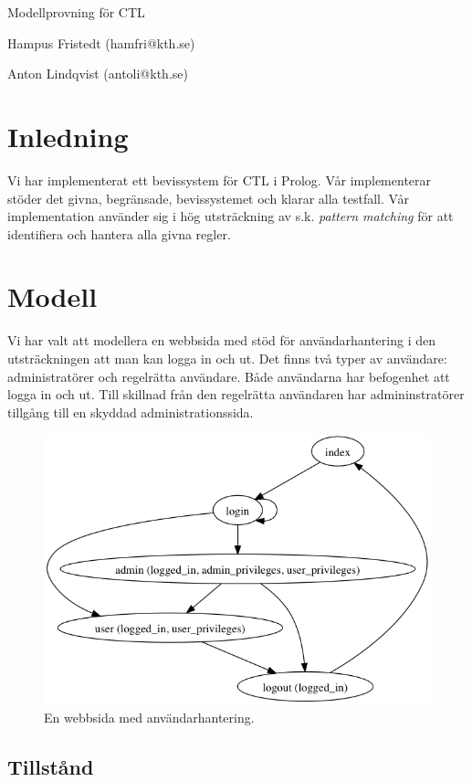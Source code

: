 \documentclass{article}
\begin{document}
  \centerline{\sc \large Modellprovning för CTL}
  \vspace{.5pc}
  \centerline{Hampus Fristedt (hamfri@kth.se)}
  \centerline{Anton Lindqvist (antoli@kth.se)}
  \vspace{2pc}

  \section{Inledning}
  Vi har implementerat ett bevissystem för CTL i Prolog. Vår implementerar
  stöder det givna, begränsade, bevissystemet och klarar alla testfall. Vår
  implementation använder sig i hög utsträckning av s.k. \emph{pattern matching}
  för att identifiera och hantera alla givna regler.

  \section{Modell}
  Vi har valt att modellera en webbsida med stöd för användarhantering i den
  utsträckningen att man kan logga in och ut. Det finns två typer av användare:
  administratörer och regelrätta användare. Både användarna har befogenhet att
  logga in och ut. Till skillnad från den regelrätta användaren har
  admininstratörer tillgång till en skyddad administrationssida.
  \begin{figure}[h!]
    \centering
    \includegraphics[scale=0.4]{model.png}
    \caption{En webbsida med användarhantering.}
  \end{figure}

  \subsection{Tillstånd}
\end{document}
